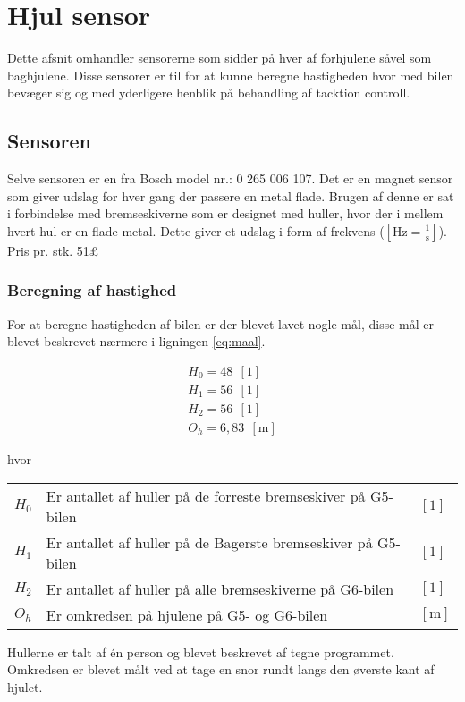 \documentclass[12pt,a4paper]{report}
\begin{document}
\chapter{Hjul sensor}
Dette afsnit omhandler sensorerne som sidder på hver af forhjulene såvel som baghjulene. Disse sensorer er til for at kunne beregne hastigheden hvor med bilen bevæger sig og med yderligere henblik på behandling af tacktion controll.

\section{Sensoren}
Selve sensoren er en fra Bosch model nr.: 0 265 006 107. Det er en magnet sensor som giver udslag for hver gang der passere en metal flade. Brugen af denne er sat i forbindelse med bremseskiverne som er designet med huller, hvor der i mellem hvert hul er en flade metal. Dette giver et udslag i form af frekvens ($\left[\text{Hz} = \frac{1}{\text{s}}\right]$).
Pris pr. stk. 51£

\subsection*{Beregning af hastighed}
For at beregne hastigheden af bilen er der blevet lavet nogle mål, disse mål er blevet beskrevet nærmere i ligningen \ref{eq:maal}.

\begin{center}
	\begin{subequations} \label{eq:maal}
		\begin{align}
H_{0} = 48 ~~ \left[\text{1}\right] \\
H_{1} = 56 ~~ \left[\text{1}\right] \\
H_{2} = 56 ~~ \left[\text{1}\right] \\
O_{h} = 6,83 ~~ \left[\text{m}\right]
		\end{align}	
	\end{subequations}
\end{center}
hvor
\begin{center}
	\begin{tabular}{ l l l }
	  $H_{0}$ & Er antallet af huller på de forreste bremseskiver på G5-bilen & $\left[1\right]$ \\
	  $H_{1}$ & Er antallet af huller på de Bagerste bremseskiver på G5-bilen & $\left[1\right]$\\
	  $H_{2}$ & Er antallet af huller på alle bremseskiverne på G6-bilen & $\left[1\right]$ \\
	  $O_{h}$ & Er omkredsen på hjulene på G5- og G6-bilen & $\left[\text{m}\right]$ \\
	\end{tabular}  
\end{center}  
Hullerne er talt af én person og blevet beskrevet af tegne programmet. Omkredsen er blevet målt ved at tage en snor rundt langs den øverste kant af hjulet.
\end{document}
